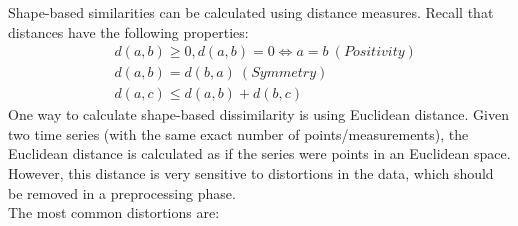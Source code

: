 Shape-based similarities can be calculated using distance measures. Recall that distances have the following properties:
\begin{align*}
    &d(a,b) \geq 0, d(a,b) = 0 \iff a = b \ (Positivity) \\
    &d(a,b) = d(b,a) \ (Symmetry) \\
    &d(a,c) \leq d(a,b) + d(b,c)
\end{align*}
One way to calculate shape-based dissimilarity is using Euclidean distance. Given two time series (with the same exact number of points/measurements), the Euclidean distance is calculated as if the series were points in an Euclidean space. However, this distance is very sensitive to distortions in the data, which should be removed in a preprocessing phase.\\
The most common distortions are:
